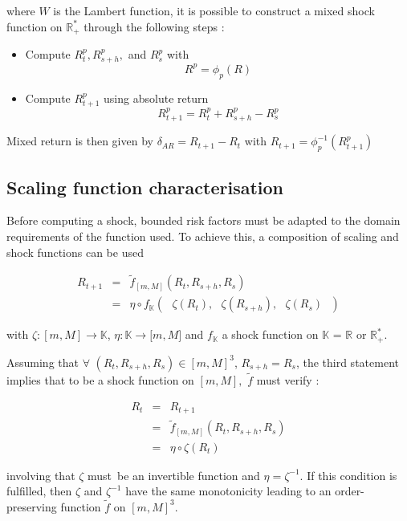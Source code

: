 \documentclass[10pt,a4paper]{report}
\begin{document}
where $W$ is the Lambert function, it is possible to construct a mixed shock
function on $\mathbb{R}_{+}^{\ast }$ through the following steps :

\bigskip

\begin{itemize}
\item Compute $R_{t}^{p},R_{s+h}^{p},$ and $R_{s}^{p}$ with 
\begin{equation*}
R^{p}=\phi _{p}(R)
\end{equation*}

\item Compute $R_{t+1}^{p}$ using absolute return 
\begin{equation*}
R_{t+1}^{p}=R_{t}^{p}+R_{s+h}^{p}-R_{s}^{p}
\end{equation*}
\end{itemize}

\bigskip 

Mixed return is then given by $ \delta _{AR} =R_{t+1}-R_{t} $ with $ R_{t+1} =\phi _{p}^{-1}(R_{t+1}^{p}) $

\newpage

\subsection{Scaling function characterisation}

Before computing a shock, bounded risk factors must be adapted to the domain
requirements of the function used. To achieve this, a composition of scaling
and shock functions can be used

\begin{eqnarray*}
R_{t+1} &=&\tilde{f}_{[m,M]}\left( R_{t},R_{s+h},R_{s}\right)  \\
&=&\eta \circ f_{\mathbb{K}}\left( \text{ }\zeta (R_{t}),\text{ }\zeta
(R_{s+h}),\text{ }\zeta (R_{s})\text{ }\right) 
\end{eqnarray*}

\bigskip

with $\zeta :[m,M]\rightarrow \mathbb{K}$, $\eta :\mathbb{K}\rightarrow
\lbrack m,M]$ and $f_{\mathbb{K}}$ a shock function on $\mathbb{K}$ = $%
\mathbb{R}$ or $\mathbb{R}_{+}^{\ast }$.

\bigskip
\bigskip

 Assuming that $\forall $ $%
(R_{t},R_{s+h},R_{s})\in \left[ m,M\right] ^{3}$, $R_{s+h}=R_{s}$, the third statement implies that to be a shock function on $[m,M],$ $\tilde{f}$ must verify : 

\begin{eqnarray*}
R_{t} &=&R_{t+1} \\
&=&\tilde{f}_{[m,M]}\left( R_{t},R_{s+h},R_{s}\right)  \\
&=&\eta \circ \zeta (R_{t})
\end{eqnarray*}

\bigskip

involving that $\zeta $ must\ be an invertible function and $\eta =\zeta ^{-1}$. If this condition is fulfilled, then $\zeta $ and $\zeta ^{-1}$ have the same monotonicity leading to an order-preserving function $\tilde{f}$ on $\left[ m,M\right]^{3}$.
\end{document}
